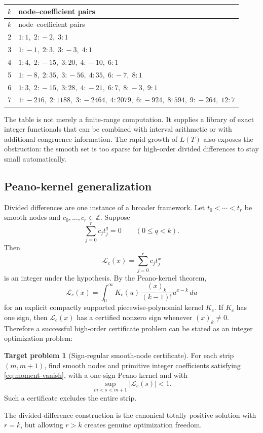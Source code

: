 \documentclass[11pt]{article}
\theoremstyle{definition}
\newtheorem{problem}[theorem]{Target problem}
\theoremstyle{remark}
\newcommand{\ZZ}{\mathbb Z}
\newcommand{\fall}[2]{(#1)_{#2}}
\begin{document}
\begin{center}
\small
\begin{longtable}{@{}c>{\raggedright\arraybackslash}p{125mm}@{}}
\toprule
$k$ & node--coefficient pairs\\
\midrule
\endfirsthead
\toprule
$k$ & node--coefficient pairs\\
\midrule
\endhead
2 & \( 1\!:\!1,\;2\!:\!-2,\;3\!:\!1 \) \\
3 & \( 1\!:\!-1,\;2\!:\!3,\;3\!:\!-3,\;4\!:\!1 \) \\
4 & \( 1\!:\!4,\;2\!:\!-15,\;3\!:\!20,\;4\!:\!-10,\;6\!:\!1 \) \\
5 & \( 1\!:\!-8,\;2\!:\!35,\;3\!:\!-56,\;4\!:\!35,\;6\!:\!-7,\;8\!:\!1 \) \\
6 & \( 1\!:\!3,\;2\!:\!-15,\;3\!:\!28,\;4\!:\!-21,\;6\!:\!7,\;8\!:\!-3,\;9\!:\!1 \) \\
7 & \( 1\!:\!-216,\;2\!:\!1188,\;3\!:\!-2464,\;4\!:\!2079,\;6\!:\!-924,\;8\!:\!594,\;9\!:\!-264,\;12\!:\!7 \) \\
\bottomrule
\end{longtable}
\end{center}

The table is not merely a finite-range computation. It supplies a library of exact integer functionals that can be combined with interval arithmetic or with additional congruence information. The rapid growth of $L(T)$ also exposes the obstruction: the smooth set is too sparse for high-order divided differences to stay small automatically.

\subsection{Peano-kernel generalization}

Divided differences are one instance of a broader framework. Let $t_0<\cdots<t_r$ be smooth nodes and $c_0,\ldots,c_r\in\ZZ$. Suppose
\begin{equation}\label{eq:moment-vanish}
  \sum_{j=0}^{r}c_jt_j^q=0\qquad(0\le q<k).
\end{equation}
Then
\[
  \mathscr L_c(x)=\sum_{j=0}^{r}c_jt_j^x
\]
is an integer under the hypothesis. By the Peano-kernel theorem,
\[
 \mathscr L_c(x)=\int_0^\infty K_c(u)\,
 \frac{\fall{x}{k}}{(k-1)!}u^{x-k}\,du
\]
for an explicit compactly supported piecewise-polynomial kernel $K_c$. If $K_c$ has one sign, then $\mathscr L_c(x)$ has a certified nonzero sign whenever $\fall{x}{k}\ne0$. Therefore a successful high-order certificate problem can be stated as an integer optimization problem:
\begin{problem}[Sign-regular smooth-node certificate]\label{prob:peano}
For each strip $(m,m+1)$, find smooth nodes and primitive integer coefficients satisfying \eqref{eq:moment-vanish}, with a one-sign Peano kernel and with
\[
 \sup_{m<s<m+1}|\mathscr L_c(s)|<1.
\]
Such a certificate excludes the entire strip.
\end{problem}
The divided-difference construction is the canonical totally positive solution with $r=k$, but allowing $r>k$ creates genuine optimization freedom.
\end{document}
